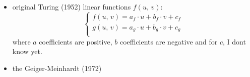 \begin{itemize}
    \item original Turing (1952) linear functions $f(u,\,v)$:
    \begin{equation}
        \begin{cases}
            f(u,\,v) = a_f\cdot u + b_f\cdot v + c_f \\
            g(u,\,v) = a_g\cdot u + b_g\cdot v + c_g \\            
        \end{cases}
    \end{equation}
    where $a$ coefficients are positive, $b$ coefficients are negative and for $c$, I dont know yet.


    \item the Geiger-Meinhardt (1972)
\end{itemize}


\newpage